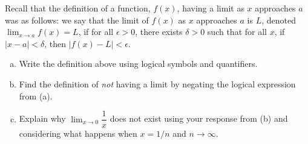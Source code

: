\documentclass[11pt,letterpaper]{article}
\begin{document}
\newpage



 Recall that the definition of a function, $f(x)$, having a limit as $x$ approaches $a$ was as follows: we say that the limit of $f(x)$ as $x$ approaches $a$ is $L$, denoted $\displaystyle \lim_{x \to a} f(x)= L$, if for all $\epsilon > 0$, there exists $\delta > 0$ such that for all $x$, if $|x - a| < \delta$, then $|f(x) - L| < \epsilon$. 
	\begin{enumerate}[(a)]
	\item Write the definition above using logical symbols and quantifiers.
	\item Find the definition of \textit{not} having a limit by negating the logical expression from (a).
	\item Explain why $\displaystyle \lim_{x \to 0} \dfrac{1}{x}$ does not exist using your response from (b) and considering what happens when $x= 1/n$ and $n \to \infty$. 
	\end{enumerate} \pspace
\end{document}
